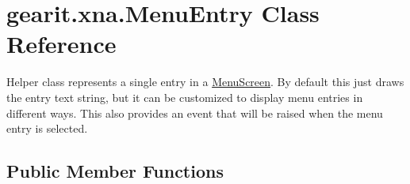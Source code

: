 \hypertarget{classgearit_1_1xna_1_1_menu_entry}{\section{gearit.\+xna.\+Menu\+Entry Class Reference}
\label{classgearit_1_1xna_1_1_menu_entry}
}


Helper class represents a single entry in a \hyperlink{classgearit_1_1xna_1_1_menu_screen}{Menu\+Screen}. By default this just draws the entry text string, but it can be customized to display menu entries in different ways. This also provides an event that will be raised when the menu entry is selected.  


\subsection*{Public Member Functions}
